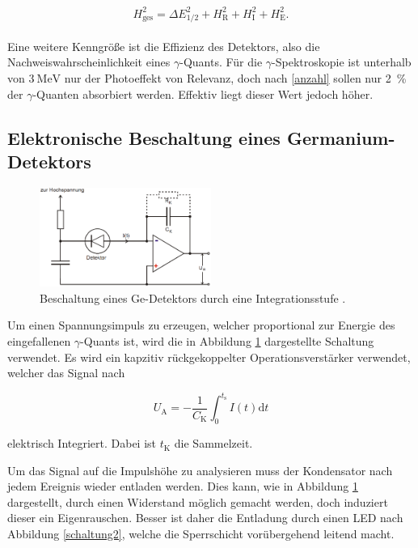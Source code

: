\begin{equation}
	H_\text{ges}^2 = \Delta E_\text{1/2}^2 + H_\text{R}^2 + H_\text{I}^2 + H_\text{E}^2 .
\end{equation}
\\
Eine weitere Kenngröße ist die Effizienz des Detektors, also die Nachweiswahrscheinlichkeit eines $\gamma$-Quants.
Für die $\gamma$-Spektroskopie ist unterhalb von $\SI{3}{\mega\electronvolt}$ nur der Photoeffekt von Relevanz, doch nach \eqref{anzahl} sollen nur \SI{2}{\%} der $\gamma$-Quanten absorbiert werden.
Effektiv liegt dieser Wert jedoch höher.
\FloatBarrier
\subsection{Elektronische Beschaltung eines Germanium-Detektors} %
\label{sub:elektronische_beschaltung_eines_germanium_detektors}

\begin{figure}
	\centering
	\includegraphics[width = 0.5\textwidth]{pic/schaltung1.png}
	\caption{Beschaltung eines Ge-Detektors durch eine Integrationsstufe \cite{anleitung}.}
	\label{schaltung1}
\end{figure}

Um einen Spannungsimpuls zu erzeugen, welcher proportional zur Energie des eingefallenen $\gamma$-Quants ist, wird die in Abbildung \ref{schaltung1} dargestellte Schaltung verwendet.
Es wird ein kapzitiv rückgekoppelter Operationsverstärker verwendet, welcher das Signal nach

\begin{equation}
	U_\text{A} = - \frac{1}{C_\text{K}} \int_0^{t_\text{s}} I(t) \text{d}t
\end{equation}

elektrisch Integriert.
Dabei ist $t_\text{K}$ die Sammelzeit.
\FloatBarrier

Um das Signal auf die Impulshöhe zu analysieren muss der Kondensator nach jedem Ereignis wieder entladen werden.
Dies kann, wie in Abbildung \ref{schaltung1} dargestellt, durch einen Widerstand möglich gemacht werden, doch induziert dieser ein Eigenrauschen.
Besser ist daher die Entladung durch einen LED nach Abbildung \ref{schaltung2}, welche die Sperrschicht vorübergehend leitend macht.


